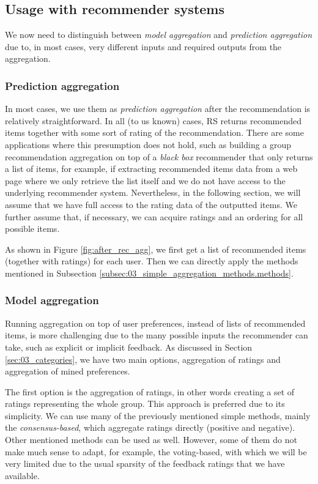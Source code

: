 \subsection{Usage with recommender systems}
We now need to distinguish between \textit{model aggregation} and \textit{prediction aggregation} due to, in most cases, very different inputs and required outputs from the aggregation.
\subsubsection{Prediction aggregation}
In most cases, we use them as \textit{prediction aggregation} after the recommendation is relatively straightforward. In all (to us known) cases, RS returns recommended items together with some sort of rating of the recommendation. There are some applications where this presumption does not hold, such as building a group recommendation aggregation on top of a \textit{black box} recommender that only returns a list of items, for example, if extracting recommended items data from a web page where we only retrieve the list itself and we do not have access to the underlying recommender system. Nevertheless, in the following section, we will assume that we have full access to the rating data of the outputted items. We further assume that, if necessary, we can acquire ratings and an ordering for all possible items.

As shown in Figure \ref{fig:after_rec_agg}, we first get a list of recommended items (together with ratings) for each user. Then we can directly apply the methods mentioned in Subsection \ref{subsec:03_simple_aggregation_methods.methods}.

\subsubsection{Model aggregation}
Running aggregation on top of user preferences, instead of lists of recommended items, is more challenging due to the many possible inputs the recommender can take, such as explicit or implicit feedback. As discussed in Section \ref{sec:03_categories}, we have two main options, aggregation of ratings and aggregation of mined preferences.

The first option is the aggregation of ratings, in other words creating a set of ratings representing the whole group. This approach is preferred due to its simplicity. We can use many of the previously mentioned simple methods, mainly the \textit{consensus-based}, which aggregate ratings directly (positive and negative). Other mentioned methods can be used as well. However, some of them do not make much sense to adapt, for example, the voting-based, with which we will be very limited due to the usual sparsity of the feedback ratings that we have available.

